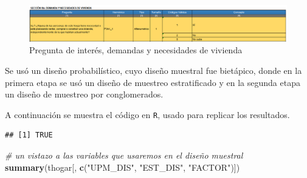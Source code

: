 \documentclass[
]{article}
\newenvironment{Shaded}{\begin{snugshade}}{\end{snugshade}}
\newcommand{\CommentTok}[1]{\textcolor[rgb]{0.56,0.35,0.01}{\textit{#1}}}
\newcommand{\DecValTok}[1]{\textcolor[rgb]{0.00,0.00,0.81}{#1}}
\newcommand{\KeywordTok}[1]{\textcolor[rgb]{0.13,0.29,0.53}{\textbf{#1}}}
\newcommand{\NormalTok}[1]{#1}
\newcommand{\OperatorTok}[1]{\textcolor[rgb]{0.81,0.36,0.00}{\textbf{#1}}}
\newcommand{\StringTok}[1]{\textcolor[rgb]{0.31,0.60,0.02}{#1}}
\begin{document}
\begin{figure}[H]
\centering
    \includegraphics[width=160mm]{images/enc.png}
    \caption{Pregunta de interés, demandas y necesidades de vivienda}
    \label{Pregunta de interés}
\end{figure}

Se usó un diseño probabilístico, cuyo diseño muestral fue bietápico,
donde en la primera etapa se usó un diseño de muestreo estratificado y
en la segunda etapa un diseño de muestreo por conglomerados.

A continuación se muestra el código en \texttt{R}, usado para replicar los resultados.

\begin{Shaded}
\end{Shaded}

\begin{verbatim}
## [1] TRUE
\end{verbatim}

\begin{Shaded}
\begin{Highlighting}[]
\CommentTok{# un vistazo a las variables que usaremos en el diseño muestral}
\KeywordTok{summary}\NormalTok{(thogar[, }\KeywordTok{c}\NormalTok{(}\StringTok{"UPM_DIS"}\NormalTok{, }\StringTok{"EST_DIS"}\NormalTok{, }\StringTok{"FACTOR"}\NormalTok{)])}
\end{Highlighting}
\end{Shaded}
\end{document}
